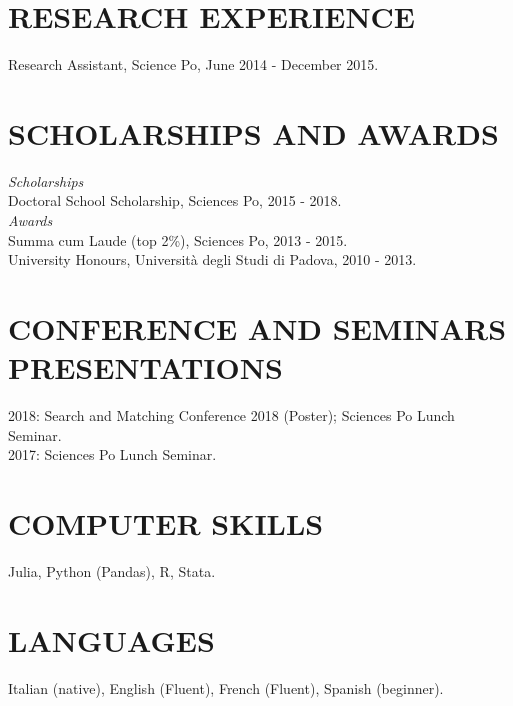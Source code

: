 \documentclass{res}
\begin{document}
\begin{resume}
\section{\small RESEARCH EXPERIENCE}
   \vspace{0.02in}
   Research Assistant, Science Po, June 2014 - December 2015.
    
\section{\small SCHOLARSHIPS AND AWARDS}
   \vspace{0.02in}
\textit{Scholarships} \vspace{0.02in} \\
Doctoral School Scholarship, Sciences Po, 2015 - 2018. \vspace{0.04in} \\
\textit{Awards} \vspace{0.02in} \\   
Summa cum Laude (top 2\%), Sciences Po, 2013 - 2015. \\
University Honours, Universit\`{a} degli Studi di Padova, 2010 - 2013. 

\section{\small CONFERENCE AND SEMINARS PRESENTATIONS}
    2018: Search and Matching Conference 2018 (Poster); Sciences Po Lunch Seminar. \\
	2017: Sciences Po Lunch Seminar.
\section{\small COMPUTER SKILLS}
   \vspace{0.02in}
	Julia, Python (Pandas), R, Stata.

\section{\small LANGUAGES}
   \vspace{0.02in}
    Italian (native), English (Fluent), French (Fluent), Spanish (beginner).
    
\end{resume}
\end{document}
